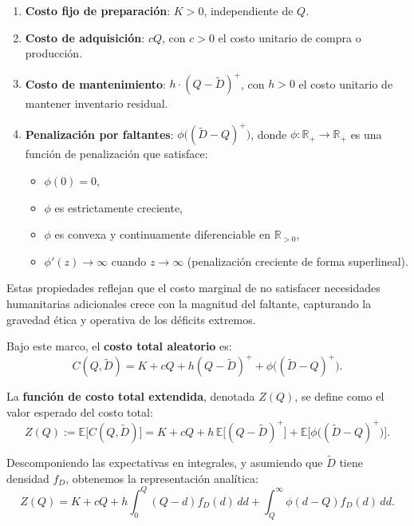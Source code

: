 \documentclass[
  spanish,
  us-letterpaper,
]{scrreprt}
\providecommand{\tightlist}{%
  \setlength{\itemsep}{0pt}\setlength{\parskip}{0pt}}
\numberwithin{equation}{section}
\begin{document}
\begin{enumerate}
\def\labelenumi{\arabic{enumi}.}
\tightlist
\item
  \textbf{Costo fijo de preparación}: \(K > 0\), independiente de
  \(Q\).\\
\item
  \textbf{Costo de adquisición}: \(c Q\), con \(c > 0\) el costo
  unitario de compra o producción.\\
\item
  \textbf{Costo de mantenimiento}: \(h \cdot (Q - \tilde{D})^{+}\), con
  \(h > 0\) el costo unitario de mantener inventario residual.\\
\item
  \textbf{Penalización por faltantes}:
  \(\phi\big((\tilde{D} - Q)^{+}\big)\), donde
  \(\phi: \mathbb{R}_{+} \to \mathbb{R}_{+}\) es una función de
  penalización que satisface:

  \begin{itemize}
  \tightlist
  \item
    \(\phi(0) = 0\),
  \item
    \(\phi\) es estrictamente creciente,
  \item
    \(\phi\) es convexa y continuamente diferenciable en
    \(\mathbb{R}_{>0}\),
  \item
    \(\phi'(z) \to \infty\) cuando \(z \to \infty\) (penalización
    creciente de forma superlineal).
  \end{itemize}
\end{enumerate}

Estas propiedades reflejan que el costo marginal de no satisfacer
necesidades humanitarias adicionales crece con la magnitud del faltante,
capturando la gravedad ética y operativa de los déficits extremos.

Bajo este marco, el \textbf{costo total aleatorio} es: \[
C(Q, \tilde{D}) = K + c Q + h (Q - \tilde{D})^{+} + \phi\big((\tilde{D} - Q)^{+}\big).
\]

La \textbf{función de costo total extendida}, denotada \(Z(Q)\), se
define como el valor esperado del costo total: \[
Z(Q) := \mathbb{E}\big[ C(Q, \tilde{D}) \big] = K + c Q + h \, \mathbb{E}\big[(Q - \tilde{D})^{+}\big] + \mathbb{E}\Big[\phi\big((\tilde{D} - Q)^{+}\big)\Big].
\]

Descomponiendo las expectativas en integrales, y asumiendo que
\(\tilde{D}\) tiene densidad \(f_D\), obtenemos la representación
analítica: \[
Z(Q) = K + c Q + h \int_0^Q (Q - d) f_D(d) \, dd + \int_Q^\infty \phi(d - Q) f_D(d) \, dd.
\]
\end{document}
